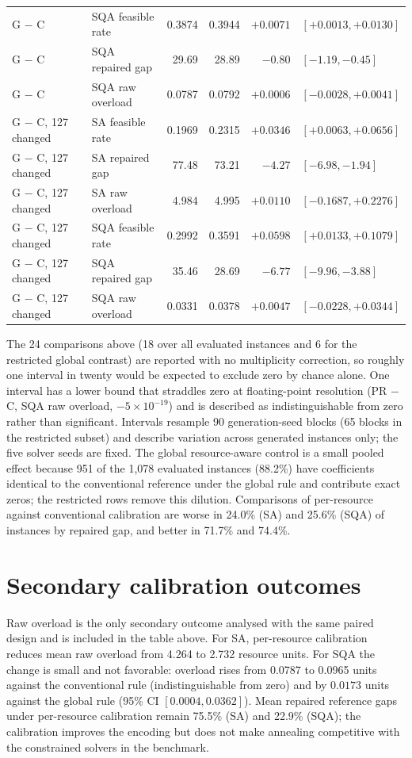\documentclass[pdflatex,sn-nature]{sn-jnl}
\begin{document}
\begin{table}[h]
{\begin{tabular}{@{}llrrrl@{}}
G $-$ C & SQA feasible rate & 0.3874 & 0.3944 & $+0.0071$ & $[+0.0013,+0.0130]$\\
G $-$ C & SQA repaired gap & 29.69 & 28.89 & $-0.80$ & $[-1.19,-0.45]$\\
G $-$ C & SQA raw overload & 0.0787 & 0.0792 & $+0.0006$ & $[-0.0028,+0.0041]$\\
\addlinespace
G $-$ C, 127 changed & SA feasible rate & 0.1969 & 0.2315 & $+0.0346$ & $[+0.0063,+0.0656]$\\
G $-$ C, 127 changed & SA repaired gap & 77.48 & 73.21 & $-4.27$ & $[-6.98,-1.94]$\\
G $-$ C, 127 changed & SA raw overload & 4.984 & 4.995 & $+0.0110$ & $[-0.1687,+0.2276]$\\
G $-$ C, 127 changed & SQA feasible rate & 0.2992 & 0.3591 & $+0.0598$ & $[+0.0133,+0.1079]$\\
G $-$ C, 127 changed & SQA repaired gap & 35.46 & 28.69 & $-6.77$ & $[-9.96,-3.88]$\\
G $-$ C, 127 changed & SQA raw overload & 0.0331 & 0.0378 & $+0.0047$ & $[-0.0228,+0.0344]$\\
\bottomrule
\end{tabular}%
}
\end{table}
The 24 comparisons above (18 over all evaluated instances and 6 for the restricted global contrast) are reported with no multiplicity correction, so roughly one interval in twenty would be expected to exclude zero by chance alone. One interval has a lower bound that straddles zero at floating-point resolution (PR $-$ C, SQA raw overload, $-5\times10^{-19}$) and is described as indistinguishable from zero rather than significant. Intervals resample 90 generation-seed blocks (65 blocks in the restricted subset) and describe variation across generated instances only; the five solver seeds are fixed. The global resource-aware control is a small pooled effect because 951 of the 1,078 evaluated instances (88.2\%) have coefficients identical to the conventional reference under the global rule and contribute exact zeros; the restricted rows remove this dilution. Comparisons of per-resource against conventional calibration are worse in 24.0\% (SA) and 25.6\% (SQA) of instances by repaired gap, and better in 71.7\% and 74.4\%.

\section{Secondary calibration outcomes}
Raw overload is the only secondary outcome analysed with the same paired design and is included in the table above. For SA, per-resource calibration reduces mean raw overload from 4.264 to 2.732 resource units. For SQA the change is small and not favorable: overload rises from 0.0787 to 0.0965 units against the conventional rule (indistinguishable from zero) and by $0.0173$ units against the global rule (95\% CI $[0.0004,0.0362]$). Mean repaired reference gaps under per-resource calibration remain 75.5\% (SA) and 22.9\% (SQA); the calibration improves the encoding but does not make annealing competitive with the constrained solvers in the benchmark.
\end{document}
